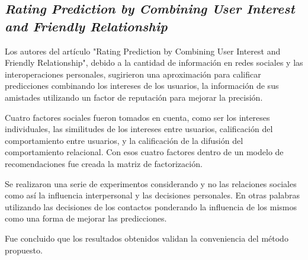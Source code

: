 \subsection{
    \textbf{\emph{Rating Prediction by Combining User Interest
            and Friendly Relationship}
    }
}

Los autores del artículo "Rating Prediction by Combining User Interest
and Friendly Relationship"\cite[pág. 167]{somaniEmerging2019}, debido a la cantidad de información en redes sociales y las interoperaciones personales, sugirieron una aproximación para calificar predicciones combinando los intereses de los usuarios, la información de sus amistades
utilizando un factor de reputación para mejorar la precisión.\par

Cuatro factores sociales fueron tomados en cuenta, como ser los intereses individuales,
las similitudes de los intereses entre usuarios, calificación del comportamiento entre usuarios,
y la calificación de la difusión del comportamiento relacional. Con esos cuatro factores dentro
de un modelo de recomendaciones fue creada la matriz de factorización.\par

Se realizaron una serie de experimentos considerando y no las relaciones sociales
como así la influencia interpersonal y las decisiones personales.
En otras palabras utilizando las decisiones de los contactos ponderando
la influencia de los mismos como una forma de mejorar las predicciones.\par

Fue concluido que los resultados obtenidos validan la conveniencia del método propuesto.\par
